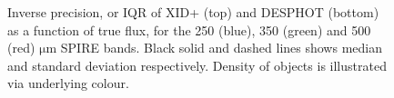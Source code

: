 \documentclass[useAMS,usenatbib]{mnras}
\begin{document}
\begin{figure}
\caption{Inverse precision, or IQR of \textsc{XID+} (top) and \textsc{DESPHOT} (bottom) as a function of true flux, for the 250 (blue), 350 (green) and 500 (red) $\mathrm{\mu m}$ SPIRE bands. Black solid and dashed lines shows median and standard deviation respectively. Density of objects is illustrated via underlying colour. }\label{fig:precision}
\end{figure}
\end{document}
